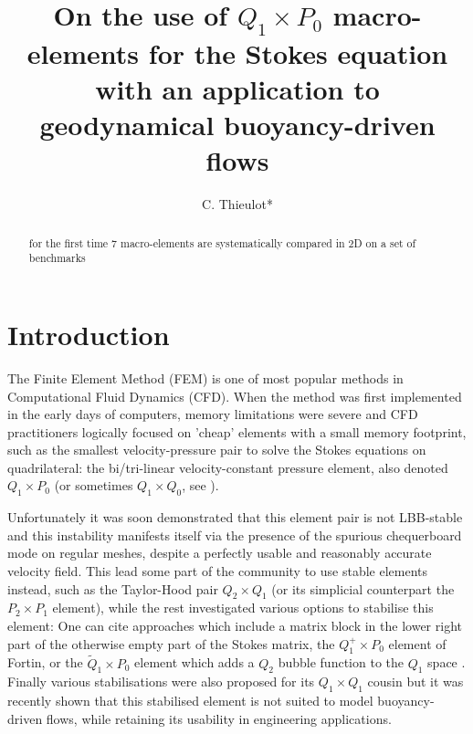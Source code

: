 \documentclass[a4paper]{article}
\title{
On the use of $Q_1\times P_0$ macro-elements for the Stokes equation with an application to 
geodynamical buoyancy-driven flows
}
\author{C. Thieulot*}
\begin{document}
\maketitle

\begin{abstract}
for the first time 7 macro-elements are systematically compared in 2D on a set of benchmarks
\end{abstract}

\tableofcontents

\section{Introduction} \label{sec1}


The Finite Element Method (FEM) is one of most popular methods in Computational Fluid Dynamics (CFD). 
When the method was first implemented 
in the early days of computers, memory limitations were severe and CFD practitioners logically 
focused on 'cheap' elements with a small memory footprint, such as the smallest velocity-pressure pair to 
solve the Stokes equations on quadrilateral: the bi/tri-linear velocity-constant pressure element, 
also denoted $Q_1 \times P_0$ (or sometimes $Q_1\times Q_0$, see \cite{grsa}). 

Unfortunately it was soon demonstrated \cite{XXX} that this element pair is not LBB-stable and this instability
manifests itself via the presence of the spurious chequerboard mode on regular meshes, despite a perfectly usable and 
reasonably accurate velocity field. 
This lead some part of the community to use stable elements instead, such as the Taylor-Hood pair $Q_2\times Q_1$
(or its simplicial counterpart the $P_2\times P_1$ element), 
while the rest investigated various options to stabilise this element:
One can cite approaches which include a matrix block in the lower right part of 
the otherwise empty part of the Stokes matrix\cite{kesi88,sike90,vibo92,nosi98},
the $Q_1^+\times P_0$ element of Fortin\cite{fort81}, or the $\tilde{Q}_1\times P_0$ element which adds 
a $Q_2$ bubble function to the $Q_1$ space \cite[p265]{brfo}.
Finally various stabilisations were also proposed for its 
$Q_1\times Q_1$ cousin \cite{dobo04,bodg06} but it was recently shown\cite{thba22} 
that this stabilised element is not suited to model buoyancy-driven flows, 
while retaining its usability in engineering applications.  
\end{document}
